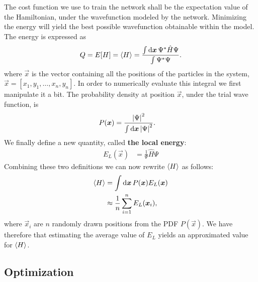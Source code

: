 \documentclass[a4paper, 11pt]{article}
\begin{document}
\begin{multicols}{2}
    The cost function we use to train the network shall be the expectation value
    of the Hamiltonian, under the wavefunction modeled by the network.
    Minimizing the energy will yield the best possible wavefunction obtainable
    within the model. The energy is expressed as
    \begin{align}
        Q = E[H] = \expval{H} = \frac{\int \dd{\bm x} \Psi^* \hat H \Psi}{\int
        \Psi^*\Psi}.
    \end{align}
    where $\vec x$ is the vector containing all the positions of the particles in
    the system, $\vec x = [x_1, y_1,\dots, x_n, y_n]$.
    In order to numerically evaluate this integral we first manipulate it a bit.
    The probability density at position $\vec x$, under the trial wave function, is
    \begin{align}
        P(\bm x) &= \frac{\abs{\Psi}^2}{\int \dd{\bm x}\abs{\Psi}^2}.
    \end{align}
    We finally define a new quantity, called \textbf{the local energy}:
    \begin{align}
        E_L(\vec x) &= \frac{1}{\Psi}\hat H\Psi\label{eq:E_L}
    \end{align}
    Combining these two definitions we can now rewrite $\expval{H}$ as follows:
    \begin{align}
        \begin{split}
            \expval{H} &= \int \dd{\bm x} P(\bm x) E_L(\bm x)\\
            &\approx
            \frac{1}{n}\sum_{i=1}^n E_L(\bm x_i),
        \end{split}\label{eq:the-objective}
    \end{align}
    where $\vec x_i$ are $n$ randomly drawn positions from the PDF $P(\vec x)$.
    We have therefore that estimating the average value of $E_L$ yields an
    approximated value for $\expval{H}$. 

    \subsection{Optimization}


\end{multicols}
\end{document}
